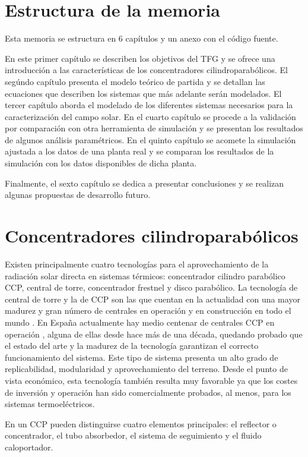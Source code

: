 \section{Estructura de la memoria}
Esta memoria se estructura en 6 capítulos y un anexo con el código fuente.

En este primer capítulo se describen los objetivos del TFG y se ofrece una introducción a las características de los concentradores cilindroparabólicos. 
El segúndo capítulo presenta el modelo teórico de partida y se detallan las ecuaciones que describen los sistemas que más adelante serán modelados.
El tercer capítulo aborda el modelado de los diferentes sistemas necesarios para la caracterización del campo solar.
En el cuarto capítulo se procede a la validación por comparación con otra herramienta de simulación y se presentan los resultados de algunos análisis paramétricos.
En el quinto capítulo se acomete la simulación ajustada a los datos de una planta real y se comparan los resultados de la simulación con los datos disponibles de dicha planta.

Finalmente, el sexto capítulo se dedica a presentar conclusiones y se realizan algunas propuestas de desarrollo futuro.

\section{Concentradores cilindroparabólicos}

Existen principalmente cuatro tecnologías para el aprovechamiento de la radiación solar directa en sistemas térmicos: concentrador cilindro parabólico CCP, central de torre, concentrador frestnel y disco parabólico. La tecnología de central de torre y la de CCP son las que cuentan en la actualidad con una mayor madurez y gran número de centrales en operación y en construcción en todo el mundo \cite{islamComprehensiveReviewStateoftheart2018}. En España actualmente hay medio centenar de centrales CCP en operación \cite{Protermosolar}, alguna de ellas desde hace más de una década, quedando probado que el estado del arte y la madurez de la tecnología garantizan el correcto funcionamiento del sistema. Este tipo de sistema presenta un alto grado de replicabilidad, modularidad y aprovechamiento del terreno. Desde el punto de vista económico, esta tecnología también resulta muy favorable ya que los costes de inversión y operación han sido comercialmente probados, al menos, para los sistemas termoeléctricos.

En un CCP pueden distinguirse cuatro elementos principales: el reflector o concentrador, el tubo absorbedor, el sistema de seguimiento y el fluido caloportador.

